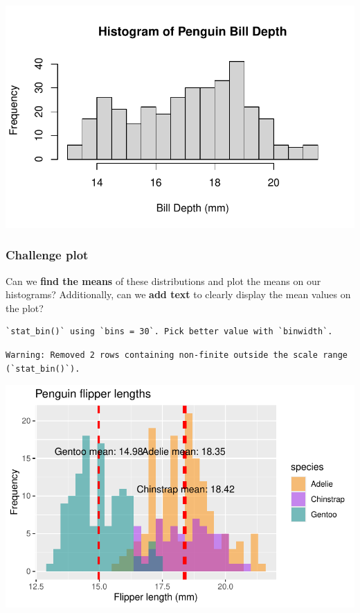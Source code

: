 \documentclass[
  letterpaper,
  DIV=11,
  numbers=noendperiod]{scrreprt}
\begin{document}
\begin{tcolorbox}
\includegraphics{scripts/02_dataViz/class4_files/figure-pdf/widths-1.pdf}

\end{tcolorbox}

\subsubsection{Challenge plot}\label{challenge-plot}

Can we \textbf{find the means} of these distributions and plot the means
on our histograms? Additionally, can we \textbf{add text} to clearly
display the mean values on the plot?

\begin{verbatim}
`stat_bin()` using `bins = 30`. Pick better value with `binwidth`.
\end{verbatim}

\begin{verbatim}
Warning: Removed 2 rows containing non-finite outside the scale range
(`stat_bin()`).
\end{verbatim}

\includegraphics{scripts/02_dataViz/class4_files/figure-pdf/unnamed-chunk-10-1.pdf}
\end{document}
